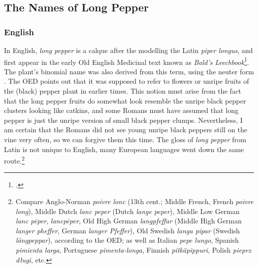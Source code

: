 \subsection{The Names of Long Pepper}

\subsubsection{English}

In English, \textit{long pepper} is a calque after the modelling the Latin \textit{piper longus}, and first appear in the early Old English Medicinal text known as \textit{Bald's Leechbook}\footcite[longpepper]{oed}. The plant's binomial name was also derived from this term, using the neuter form . The \gls{OED} points out that it was supposed to refer to flowers or unripe fruits of the (black) pepper plant in earlier times. This notion must arise from the fact that the long pepper fruits do somewhat look resemble the unripe black pepper clusters looking like catkins, and some Romans must have assumed that long pepper is just the unripe version of small black pepper clumps. Nevertheless, I am certain that the Romans did not see young unripe black peppers still on the vine very often, so we can forgive them this time. The gloss of \textit{long pepper} from Latin is not unique to English, many European languages went down the same route.\footnote{Compare Anglo-Norman \textit{poivre lonc} (13th cent.; Middle French, French \textit{poivre long}), Middle Dutch \textit{lanc peper} (Dutch \textit{lange peper}), Middle Low German \textit{lanc pēper}, \textit{lancpēper}, Old High German \textit{langpfeffar} (Middle High German \textit{langer pheffer}, German \textit{langer Pfeffer}), Old Swedish \textit{langa pipar} (Swedish \textit{långpeppar}), according to the OED; as well as Italian \textit{pepe lungo}, Spanish \textit{pimienta larga}, Portuguese \textit{pimenta-longa}, Finnish \textit{pitkäpippuri}, Polish \textit{pieprz długi}, etc.} 

